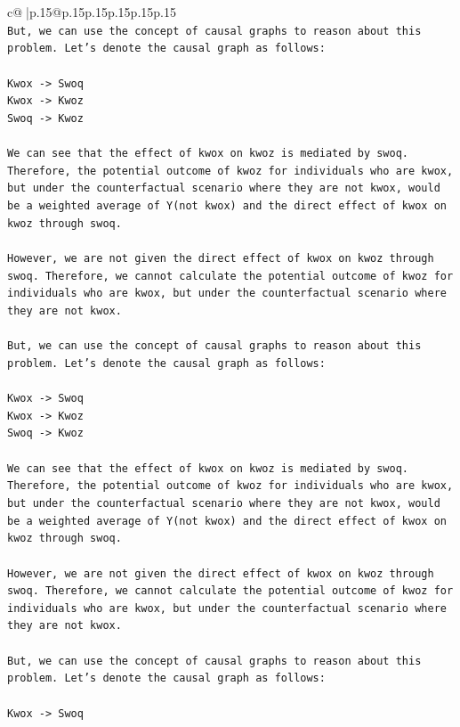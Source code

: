 \documentclass{article}
\begin{document}
{\begin{supertabular}{c@{$\;$}|p{.15\linewidth}@{}p{.15\linewidth}p{.15\linewidth}p{.15\linewidth}p{.15\linewidth}p{.15\linewidth}}
{{{\\ 
\texttt{But, we can use the concept of causal graphs to reason about this problem. Let's denote the causal graph as follows:} \\
\\ 
\texttt{Kwox {-}> Swoq} \\
\texttt{Kwox {-}> Kwoz} \\
\texttt{Swoq {-}> Kwoz} \\
\\ 
\texttt{We can see that the effect of kwox on kwoz is mediated by swoq. Therefore, the potential outcome of kwoz for individuals who are kwox, but under the counterfactual scenario where they are not kwox, would be a weighted average of Y(not kwox) and the direct effect of kwox on kwoz through swoq.} \\
\\ 
\texttt{However, we are not given the direct effect of kwox on kwoz through swoq. Therefore, we cannot calculate the potential outcome of kwoz for individuals who are kwox, but under the counterfactual scenario where they are not kwox.} \\
\\ 
\texttt{But, we can use the concept of causal graphs to reason about this problem. Let's denote the causal graph as follows:} \\
\\ 
\texttt{Kwox {-}> Swoq} \\
\texttt{Kwox {-}> Kwoz} \\
\texttt{Swoq {-}> Kwoz} \\
\\ 
\texttt{We can see that the effect of kwox on kwoz is mediated by swoq. Therefore, the potential outcome of kwoz for individuals who are kwox, but under the counterfactual scenario where they are not kwox, would be a weighted average of Y(not kwox) and the direct effect of kwox on kwoz through swoq.} \\
\\ 
\texttt{However, we are not given the direct effect of kwox on kwoz through swoq. Therefore, we cannot calculate the potential outcome of kwoz for individuals who are kwox, but under the counterfactual scenario where they are not kwox.} \\
\\ 
\texttt{But, we can use the concept of causal graphs to reason about this problem. Let's denote the causal graph as follows:} \\
\\ 
\texttt{Kwox {-}> Swoq} \\
}}}
\end{supertabular}}
\end{document}
